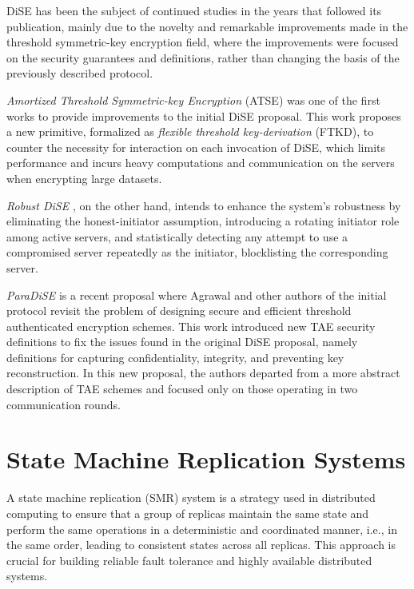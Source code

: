 DiSE has been the subject of continued studies in the years that followed its publication, mainly due to the novelty and remarkable improvements made in the threshold symmetric-key encryption field, where the improvements were focused on the security guarantees and definitions, rather than changing the basis of the previously described protocol. 

\textit{Amortized Threshold Symmetric-key Encryption} (ATSE) \cite{amortizeddise} was one of the first works to provide improvements to the initial DiSE proposal. This work proposes a new primitive, formalized as \textit{flexible threshold key-derivation} (FTKD), to counter the necessity for interaction on each invocation of DiSE, which limits performance and incurs heavy computations and communication on the servers when encrypting large datasets.

\textit{Robust DiSE} \cite{robustdise}, on the other hand, intends to enhance the system's robustness by eliminating the honest-initiator assumption, introducing a rotating initiator role among active servers, and statistically detecting any attempt to use a compromised server repeatedly as the initiator, blocklisting the corresponding server.

\textit{ParaDiSE} \cite{paradise} is a recent proposal where Agrawal and other authors of the initial protocol revisit the problem of designing secure and efficient threshold authenticated encryption schemes. This work introduced new TAE security definitions to fix the issues found in the original DiSE proposal, namely definitions for capturing confidentiality, integrity, and preventing key reconstruction. In this new proposal, the authors departed from a more abstract description of TAE schemes and focused only on those operating in two communication rounds.

\section{State Machine Replication Systems} \label{sec:smr}

A state machine replication (SMR) system \cite{smr} is a strategy used in distributed computing to ensure that a group of replicas maintain the same state and perform the same operations in a deterministic and coordinated manner, i.e., in the same order, leading to consistent states across all replicas. This approach is crucial for building reliable fault tolerance and highly available distributed systems.

